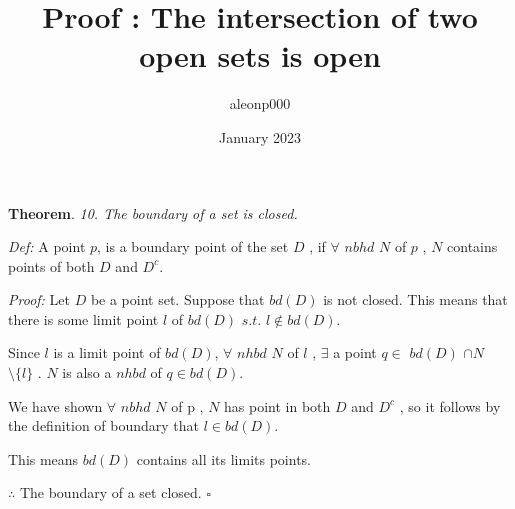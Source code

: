 \documentclass{article}
\title{Proof : The intersection of two open sets is open}
\author{aleonp000 }
\date{January 2023}
\begin{document}
\noindent
\textbf{Theorem}. \textit{10. The boundary of a set is closed. }

\textit{Def: } A point $p$, is a boundary point of the set $D$ , if $\forall$ $nbhd$ $N$ of 
$p$
 , $N$ contains points of both $D$ and $D^{c}$. 


\textit{Proof: }
 Let $D$ be a point set. Suppose that $bd(D)$ is not closed.
 This means that there is some limit point $l$ of $bd(D)$ $s.t.$ $l \notin$$bd(D)$. 
 
Since $l$ is a limit point of $bd(D)$, $\forall$ $nhbd$ $N$ of $l$ , $\exists$ a point $q \in$ $bd(D)$ $\cap$$N$ $\setminus\{l\}$ . $N$ is also a $nhbd$ of $q \in bd(D)$. 

We have shown $\forall$ $nbhd$ $N$ of p , $N$ has point in both $D$ and $D^{c}$ , so it follows by the definition of boundary that $l\in bd(D)$.

This means $bd(D)$ contains all its limits points.

 \noindent 
 $\therefore$ The boundary of a set closed.               \hfill                     $\square$
 
\end{document}

